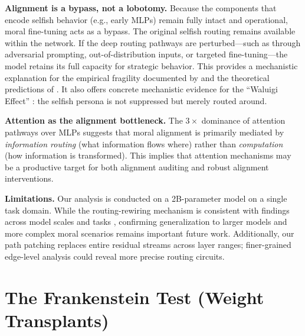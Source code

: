 \documentclass[11pt, letterpaper]{article}
\begin{document}
\textbf{Alignment is a bypass, not a lobotomy.} Because the components that encode selfish behavior (e.g., early MLPs) remain fully intact and operational, moral fine-tuning acts as a bypass. The original selfish routing remains available within the network. If the deep routing pathways are perturbed---such as through adversarial prompting, out-of-distribution inputs, or targeted fine-tuning---the model retains its full capacity for strategic behavior. This provides a mechanistic explanation for the empirical fragility documented by \citet{qi2023finetuning, lermen2023lora} and the theoretical predictions of \citet{wolf2024fundamental}. It also offers concrete mechanistic evidence for the ``Waluigi Effect'' \citep{nardo2023waluigi}: the selfish persona is not suppressed but merely routed around.

\textbf{Attention as the alignment bottleneck.} The $3\times$ dominance of attention pathways over MLPs suggests that moral alignment is primarily mediated by \textit{information routing} (what information flows where) rather than \textit{computation} (how information is transformed). This implies that attention mechanisms may be a productive target for both alignment auditing and robust alignment interventions.

\textbf{Limitations.} Our analysis is conducted on a 2B-parameter model on a single task domain. While the routing-rewiring mechanism is consistent with findings across model scales and tasks \citep{chen2025circuit, jain2023mechanistically, lee2024mechanistic}, confirming generalization to larger models and more complex moral scenarios remains important future work. Additionally, our path patching replaces entire residual streams across layer ranges; finer-grained edge-level analysis \citep{syed2023attribution} could reveal more precise routing circuits.




\newpage
\appendix

\section{The Frankenstein Test (Weight Transplants)}
\label{app:frankenstein}
\end{document}

